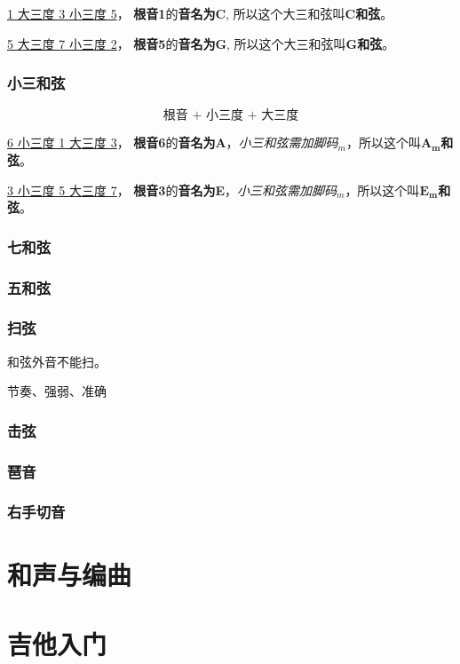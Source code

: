 \documentclass[UTF8,a4paper,12pt]{ctexbook}
\begin{document}
			\underline{1 大三度 3  小三度 5}， \textbf{根音1}的\textbf{音名为C}, 所以这个大三和弦叫\textbf{C和弦}。

			\underline{5 大三度 7  小三度 2}， \textbf{根音5}的\textbf{音名为G}, 所以这个大三和弦叫\textbf{G和弦}。
			
		\subsection{小三和弦}
			$$ \textbf{根音 +  小三度 + 大三度} $$
	
			\underline{6 小三度 1  大三度 3}， \textbf{根音6}的\textbf{音名为A}，\textit{小三和弦需加脚码}$_m$，所以这个叫\textbf{$\mathbf{A_m}$和弦}。
			
			\underline{3 小三度 5  大三度 7}， \textbf{根音3}的\textbf{音名为E}，\textit{小三和弦需加脚码}$_m$，所以这个叫\textbf{$\mathbf{E_m}$和弦}。
		
		
		\subsection{七和弦}
		
		\subsection{五和弦}
			
		\subsection{扫弦}
			和弦外音不能扫。
			
			节奏、强弱、准确
			
		\subsection{击弦}
		
		\subsection{琶音}
		
		\subsection{右手切音}
		
		
\chapter{和声与编曲}

\chapter{吉他入门}
		    
\end{document}
